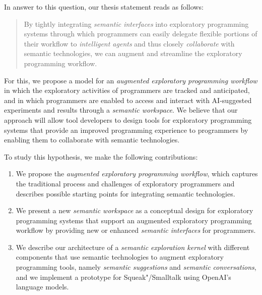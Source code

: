 In answer to this question, our thesis statement reads as follows:
%
\begin{quote}
	By tightly integrating \emph{semantic interfaces} into exploratory programming systems through which programmers can easily delegate flexible portions of their workflow to \emph{intelligent agents} and thus closely \emph{collaborate} with semantic technologies, we can augment and streamline the exploratory programming workflow.
\end{quote}

For this, we propose a model for an \emph{augmented exploratory programming workflow} in which the exploratory activities of programmers are tracked and anticipated, and in which programmers are enabled to access and interact with AI-suggested experiments and results through a \emph{semantic workspace}.
We believe that our approach will allow tool developers to design tools for exploratory programming systems that provide an improved programming experience to programmers by enabling them to collaborate with semantic technologies.

To study this hypothesis, we make the following contributions:
%
\begin{enumerate}%
	\item We propose the \emph{augmented exploratory programming workflow}, which captures the traditional process and challenges of exploratory programmers and describes possible starting points for integrating semantic technologies.
	\item We present a new \emph{semantic workspace} as a conceptual design for exploratory programming systems that support an augmented exploratory programming workflow by providing new or enhanced \emph{semantic interfaces} for programmers.
	\item We describe our architecture of a \emph{semantic exploration kernel} with different components that use semantic technologies to augment exploratory programming tools, namely \emph{semantic suggestions} and \emph{semantic conversations}, and we implement a prototype for Squeak"/Smalltalk using OpenAI's language models.
\end{enumerate}

